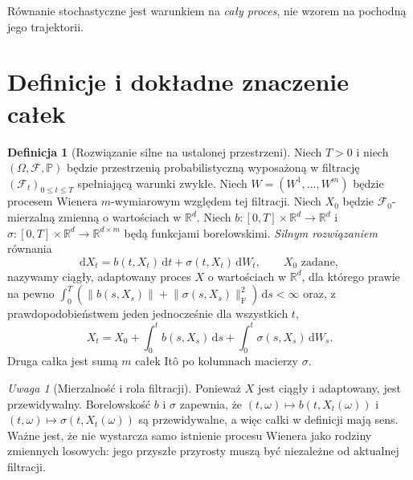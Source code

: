 \documentclass[11pt,a4paper,oneside]{report}
\numberwithin{equation}{chapter}
\theoremstyle{plain}
\theoremstyle{definition}
\newtheorem{definicja}{Definicja}[chapter]
\theoremstyle{remark}
\newtheorem{uwaga}{Uwaga}[chapter]
\newcommand{\R}{\mathbb{R}}
\newcommand{\Prob}{\mathbb{P}}
\newcommand{\calF}{\mathcal{F}}
\newcommand{\dd}{\mathrm{d}}
\newcommand{\norm}[1]{\lVert #1\rVert}
\begin{document}
\begin{center}
\par\smallskip\small Równanie stochastyczne jest warunkiem na \emph{cały proces}, nie wzorem na pochodną jego trajektorii.
\end{center}

\section{Definicje i dokładne znaczenie całek}
\begin{definicja}[Rozwiązanie silne na ustalonej przestrzeni]
\label{def:sde-strong}
Niech $T>0$ i niech $(\Omega,\calF,\Prob)$ będzie
przestrzenią probabilistyczną wyposażoną w filtrację
$(\calF_t)_{0\le t\le T}$ spełniającą warunki zwykłe.
Niech $W=(W^1,\ldots,W^m)$ będzie procesem Wienera
$m$-wymiarowym względem tej filtracji. Niech $X_0$ będzie
$\calF_0$-mierzalną zmienną o wartościach w $\R^d$.
Niech $b:[0,T]\times\R^d\to\R^d$ i
$\sigma:[0,T]\times\R^d\to\R^{d\times m}$
będą funkcjami borelowskimi. \emph{Silnym rozwiązaniem} równania
\[
\dd X_t=b(t,X_t)\,\dd t+\sigma(t,X_t)\,\dd W_t,
\qquad X_0\text{ zadane},
\tag{5.1}\label{eq:sde}
\]
nazywamy ciągły, adaptowany proces $X$ o wartościach w $\R^d$,
dla którego prawie na pewno
$\int_0^T (\norm{b(s,X_s)}+\norm{\sigma(s,X_s)}_{\mathrm F}^2)\,\dd s<\infty$
oraz, z prawdopodobieństwem jeden jednocześnie dla wszystkich $t$,
\[
X_t=X_0+\int_0^tb(s,X_s)\,\dd s
       +\int_0^t\sigma(s,X_s)\,\dd W_s.
\]
Druga całka jest sumą $m$ całek Itô po kolumnach macierzy $\sigma$.
\end{definicja}

\begin{uwaga}[Mierzalność i rola filtracji]
Ponieważ $X$ jest ciągły i adaptowany, jest przewidywalny.
Borelowskość $b$ i $\sigma$ zapewnia, że
$(t,\omega)\mapsto b(t,X_t(\omega))$ i
$(t,\omega)\mapsto\sigma(t,X_t(\omega))$ są przewidywalne,
a więc całki w definicji mają sens. Ważne jest, że nie wystarcza
samo istnienie procesu Wienera jako rodziny zmiennych losowych:
jego przyszłe przyrosty muszą być niezależne od aktualnej filtracji.
\end{uwaga}
\end{document}
